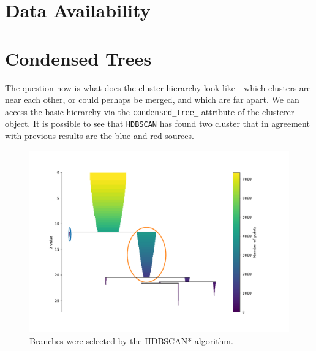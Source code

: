 \documentclass[fleqn,usenatbib]{mnras}
\begin{document}
{%
\section*{Data Availability}





 




\appendix
\section{Condensed Trees}
\label{sec:trees}

The question now is what does the cluster hierarchy look like - which
clusters are near each other, or could perhaps be merged, and which
are far apart. We can access the basic hierarchy via the \texttt{condensed\_tree\_}
attribute of the clusterer object. It is possible to see that \texttt{HDBSCAN} has found
two cluster that in agreement with previous results are the blue and red sources.

\begin{figure}
	\includegraphics[width=0.9\linewidth]{Figs/cluster-hierarchy-hdbscan.pdf}
        \caption{Branches were selected by the HDBSCAN* algorithm.}
    \label{fig:treess}
\end{figure}


\newcommand\TableHeader{
  \hline\hline
  Id Object & \(\mathrm{RA}\) & \(\mathrm{Dec}\) & Type & Redshift & Group & P(Blue) &  P(Red)\\
            &                 &                  &      &          &{\sc hac}& {\sc hdbscan}& {\sc hdbscan} \\
  \hline 
}

}
\end{document}
